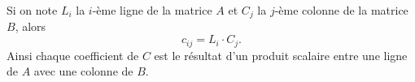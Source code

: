 \documentclass[11pt,class=report,crop=false]{standalone}
\begin{document}
Si on note $L_i$ la $i$-ème ligne de la matrice $A$ et $C_j$ la $j$-ème colonne de la matrice $B$, alors 
$$c_{ij} = L_i \cdot C_j.$$
Ainsi chaque coefficient de $C$  est le résultat d'un produit scalaire entre une ligne de $A$ avec une colonne de $B$.



\end{document}
